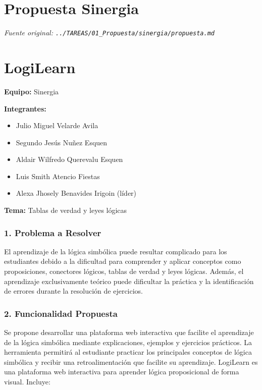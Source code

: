 \documentclass[11pt,a4paper,openany]{book}
\begin{document}
\section{Propuesta Sinergia}
\textit{Fuente original: \texttt{../TAREAS/01\_Propuesta/sinergia/propuesta.md}}

\section{LogiLearn}

\textbf{Equipo:} Sinergia

\textbf{Integrantes:}
\begin{itemize}[leftmargin=*]
\item Julio Miguel Velarde Avila
\item Segundo Jesús Nuñez Esquen
\item Aldair Wilfredo Querevalu Esquen
\item Luis Smith Atencio Fiestas
\item Alexa Jhosely Benavides Irigoin (líder)
\end{itemize}

\textbf{Tema:} Tablas de verdad y leyes lógicas

\subsubsection{1. Problema a Resolver}
El aprendizaje de la lógica simbólica puede resultar complicado para los estudiantes debido a la dificultad para comprender y aplicar conceptos como proposiciones, conectores lógicos, tablas de verdad y leyes lógicas.
Además, el aprendizaje exclusivamente teórico puede dificultar la práctica y la identificación de errores durante la resolución de ejercicios.

\subsubsection{2. Funcionalidad Propuesta}
Se propone desarrollar una plataforma web interactiva  que facilite el aprendizaje de la lógica simbólica mediante explicaciones, ejemplos y ejercicios prácticos.
La herramienta permitirá al estudiante practicar los principales conceptos de lógica simbólica y recibir una retroalimentación que facilite su aprendizaje.
LogiLearn es una plataforma web interactiva para aprender lógica proposicional de forma visual. Incluye:
\end{document}
